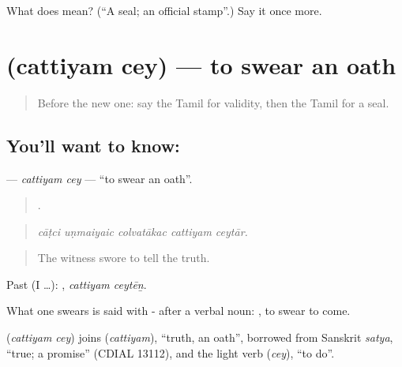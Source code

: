 \begin{tcolorbox}[breakable,colback=teal!4,colframe=teal!35!black,title={Before you move on}]
What does  mean? (\textquotedblleft{}A seal; an official stamp\textquotedblright{}.) Say it once more.
\end{tcolorbox}
\section[\texorpdfstring{\ta{சத்தியம்} \ta{செய்} (cattiyam cey)}{சத்தியம் செய் (cattiyam cey)}]{  (cattiyam cey) — to swear an oath}

\label{lesson:TA-C542-cattiyam-cey}



\begin{quote}
Before the new one: say the Tamil for validity, then the Tamil for a seal.
\end{quote}

\subsection*{You'll want to know:  }
\textbf{ } — \emph{cattiyam cey} — \textquotedblleft{}to swear an oath\textquotedblright{}.

\begin{quote}
    .
\end{quote}

\begin{quote}
\emph{cāṭci uṇmaiyaic colvatākac cattiyam ceytār.}
\end{quote}

\begin{quote}
The witness swore to tell the truth.
\end{quote}

Past (I …):  , \emph{cattiyam ceytēṉ}.

What one swears is said with - after a verbal noun:   , to swear to come.

\begin{cousinweb}
\textbf{ } (\emph{cattiyam cey}) joins  (\emph{cattiyam}), \textquotedblleft{}truth, an oath\textquotedblright{}, borrowed from Sanskrit \emph{satya}, \textquotedblleft{}true; a promise\textquotedblright{} (CDIAL 13112), and the light verb  (\emph{cey}), \textquotedblleft{}to do\textquotedblright{}.
\end{cousinweb}

